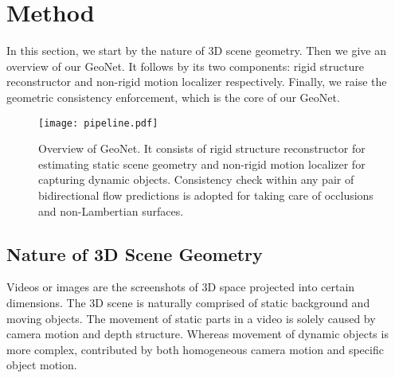 \documentclass[10pt,twocolumn,letterpaper]{article}
\newcommand{\jpshi}[1]{{{\color{blue} Jianping: #1}}}
\begin{document}
\vspace{-1ex}

\section{Method}
\label{sec:method}

In this section, we start by the nature of 3D scene geometry. Then we give an overview of our GeoNet. It follows by its two components: rigid structure reconstructor and non-rigid motion localizer respectively. Finally, we raise the geometric consistency enforcement, which is the core of our GeoNet.

\begin{figure*}[t]
\begin{center}
   \texttt{[image: pipeline.pdf]}
\end{center}
\vspace{-1ex}
   \caption{Overview of GeoNet. It consists of rigid structure reconstructor for estimating static scene geometry and non-rigid motion localizer for capturing dynamic objects.
   Consistency check within any pair of bidirectional flow predictions is adopted for taking care of occlusions and non-Lambertian surfaces.} %
   \vspace{-2ex}
\label{fig::pipeline}
\end{figure*}\subsection{Nature of 3D Scene Geometry}\label{sec::3dscene}%
Videos or images are the screenshots of 3D space projected into certain dimensions. The 3D scene is naturally comprised of static background and moving objects. The movement of static parts in a video is solely caused by camera motion and depth structure. Whereas movement of dynamic objects is more complex, contributed by both homogeneous camera motion and specific object motion.
\end{document}
